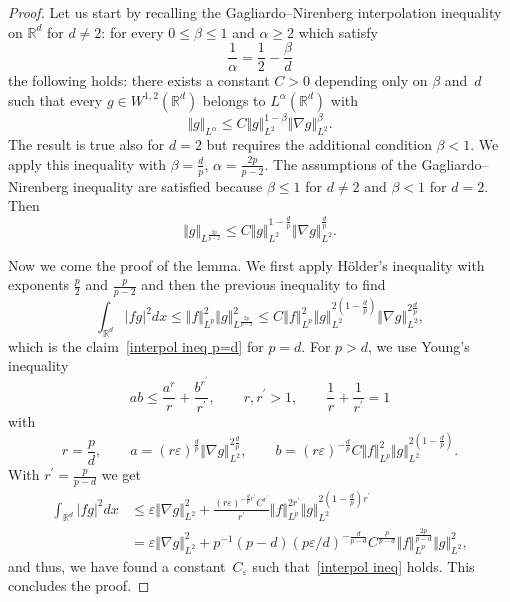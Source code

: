 \documentclass[a4paper,10pt]{article}
\newcommand\1{\mathbbm{1}}
\numberwithin{equation}{section}
\begin{document}
\begin{proof}
Let us start by recalling the Gagliardo--Nirenberg interpolation inequality on $\mathbb{R}^{d} 
$ for $d\neq2$: for every $0\leq\beta\leq1$ and $\alpha\geq2$ which satisfy
\begin{equation*}
\frac{1}{\alpha}=\frac{1}{2}-\frac{\beta}{d} 
\end{equation*}
the following holds:  there exists a constant $C > 0$ depending only on $\beta$ and~$d$ such that every $g \in W^{1,2}(\mathbb{R}^{d})$ belongs to $L^{\alpha}(\mathbb{R}^{d})$ with
\begin{equation*}
 \Vert g \Vert _{L^{\alpha}}\leq C \Vert g \Vert _{L^{2} 
}^{1-\beta} \Vert \nabla g \Vert_{L^{2}}^{\beta}.
\end{equation*}
The result is true also for $d=2$ but requires the additional condition $\beta<1$. We apply this inequality with $\beta=\frac{d}{p}$, $\alpha=\frac{2p}{p-2}$.
The assumptions of the Gagliardo--Nirenberg inequality are satisfied because $\beta\leq1$ for $d\neq2$ and $\beta<1$ for $d=2$. Then
\begin{equation*}
 \Vert g \Vert _{L^{\frac{2p}{p-2}}}\leq C \Vert g \Vert
_{L^{2}}^{1-\frac{d}{p}} \Vert \nabla g \Vert_{L^{2}}^{\frac{d}{p} 
}.
\end{equation*}

Now we come the proof of the lemma. We first apply H\"{o}lder's inequality with exponents $\frac{p}{2}$ and
$\frac{p}{p-2}$ and then the previous inequality to find
\begin{equation*}
\int_{\mathbb{R}^{d}} \vert fg \vert ^{2}dx \leq \Vert f \Vert_{L^{p}} 
^{2} \Vert g \Vert_{L^{\frac{2p}{p-2}}}^{2} \leq C\left\Vert f\right\Vert _{L^{p}} 
^{2}\left\Vert g\right\Vert _{L^{2}}^{2(1-\frac{d}{p})
}\left\Vert \nabla g\right\Vert _{L^{2}}^{2\frac{d}{p}},
\end{equation*}
which is the claim~\eqref{interpol ineq p=d} for $p=d$. For $p>d$, we use Young's
inequality 
\[
ab\leq\frac{a^{r}}{r}+\frac{b^{r^{\prime}}}{r^{\prime}},\qquad r,r^{\prime
}>1,\qquad\frac{1}{r}+\frac{1}{r^{\prime}}=1
\]
with
\[
r=\frac{p}{d},\qquad a=(r\varepsilon)  ^{\frac{d}{p}} \Vert
\nabla g \Vert _{L^{2}}^{2\frac{d}{p}},\qquad b=(r\varepsilon
)  ^{-\frac{d}{p}}C \Vert f \Vert _{L^{p}}^{2} \Vert
g \Vert _{L^{2}}^{2(1-\frac{d}{p})  }.
\]
With $r^{\prime}=\frac{p}{p-d}$ we get 
\begin{align*}
\int_{\mathbb{R}^{d}} \vert fg \vert ^{2}dx  &  \leq\varepsilon \Vert \nabla
g \Vert _{L^{2}}^{2}+\frac{(r\varepsilon)  ^{-\frac{d} 
{p}r^{\prime}}C^{r^{\prime}}}{r^{\prime}} \Vert f \Vert _{L^{p} 
}^{2r^{\prime}} \Vert g \Vert _{L^{2}}^{2(1-\frac{d} 
{p})  r^{\prime}}\\
&  =\varepsilon \Vert \nabla g \Vert _{L^{2}}^{2}+p^{-1}(
p-d)  (p\varepsilon/d)  ^{-\frac{d}{p-d}}C^{\frac{p}{p-d} 
} \Vert f \Vert _{L^{p}}^{\frac{2p}{p-d}} \Vert g \Vert
_{L^{2}}^{2},
\end{align*}
and thus, we have found a constant~$C_{\varepsilon}$ such that~\eqref{interpol ineq} holds. This concludes the proof.
\end{proof}
\end{document}
